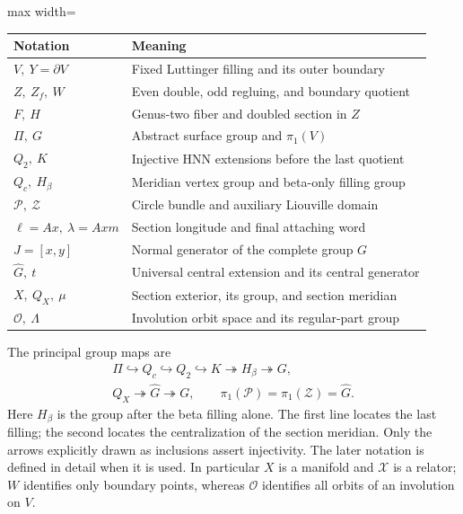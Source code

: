\documentclass[11pt]{amsart}
\theoremstyle{definition}
\theoremstyle{remark}
\begin{document}
\begin{center}
\begin{adjustbox}{max width=\textwidth}
\begin{tabular}{ll}
\toprule
Notation & Meaning \\
\midrule
$V,\ Y=\partial V$ & Fixed Luttinger filling and its outer boundary \\
$Z,\ Z_f,\ W$ & Even double, odd regluing, and boundary quotient \\
$F,\ H$ & Genus-two fiber and doubled section in $Z$ \\
$\Pi,\ G$ & Abstract surface group and $\pi_1(V)$ \\
$Q_2,\ K$ & Injective HNN extensions before the last quotient \\
$Q_c,\ H_\beta$ & Meridian vertex group and beta-only filling group \\
$\mathcal P,\ \mathcal Z$ & Circle bundle and auxiliary Liouville domain \\
$\ell=Ax,\ \lambda=Axm$ & Section longitude and final attaching word \\
$J=[x,y]$ & Normal generator of the complete group $G$ \\
$\widehat G,\ t$ & Universal central extension and its central generator \\
$X,\ Q_X,\ \mu$ & Section exterior, its group, and section meridian \\
$\mathcal O,\ \Lambda$ & Involution orbit space and its regular-part group \\
\bottomrule
\end{tabular}
\end{adjustbox}
\end{center}
The principal group maps are
\[
\begin{gathered}
 \Pi\hookrightarrow Q_c\hookrightarrow Q_2\hookrightarrow K
       \twoheadrightarrow H_\beta\twoheadrightarrow G,\\
 Q_X\twoheadrightarrow\widehat G\twoheadrightarrow G,
 \qquad \pi_1(\mathcal P)=\pi_1(\mathcal Z)=\widehat G.
\end{gathered}
\]
Here $H_\beta$ is the group after the beta filling alone. The first
line locates the last filling; the second locates the centralization
of the section meridian. Only the arrows explicitly drawn as inclusions
assert injectivity. The later notation is defined in detail when it is used. In
particular $X$ is a manifold and $\mathcal X$ is a relator;
$W$ identifies only boundary points, whereas $\mathcal O$ identifies
all orbits of an involution on $V$.
\end{document}
